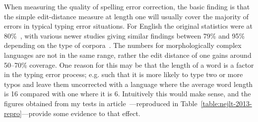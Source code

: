 \documentclass[officiallayout]{unihelcompling}
\begin{document}
When measuring the quality of spelling error correction, the basic finding is
that the simple edit-distance measure at length one will usually cover the
majority of errors in typical typing error situations. For English the original
statistics were at 80\%~\citep{damerau1964technique}, with various newer
studies giving similar findings between 79\% and 95\% depending on the type
of corpora~\citep{kukich1992spelling}.  The numbers for morphologically complex
languages are not in the same range, rather the edit distance of one gains around
50--70\% coverage. One reason for this may be that the length of a word is a
factor in the typing error process; e.g. such that it is more likely to type
two or more typos and leave them uncorrected with a language where the average
word length is 16 compared with one where it is 6. Intuitively this would make
sense, and the figures obtained from my tests in article~---reproduced in Table~\ref{table:nejlt-2013-repro}---provide some
evidence to that effect.
\end{document}
